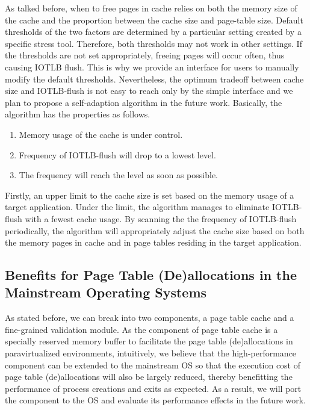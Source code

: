 As talked before, when to free pages in cache relies on both the memory size of the cache and the proportion between the cache size and page-table size. Default thresholds of the two factors are determined by a particular setting created by a specific stress tool. Therefore, both thresholds may not work in other settings. If the thresholds are not set appropriately, freeing pages will occur often, thus causing IOTLB flush. This is why we provide an interface for users to manually modify the default thresholds. Nevertheless, the optimum tradeoff between cache size and IOTLB-flush is not easy to reach only by the simple interface and we plan to propose a self-adaption algorithm in the future work. Basically, the algorithm has the properties as follows.
\begin{enumerate}
\item Memory usage of the cache is under control.
\item Frequency of IOTLB-flush will drop to a lowest level.
\item The frequency will reach the level as soon as possible.
\end{enumerate}

Firstly, an upper limit to the cache size is set based on the memory usage of a target application. Under the limit, the algorithm manages to eliminate IOTLB-flush with a fewest cache usage. By scanning the the frequency of IOTLB-flush periodically, the algorithm will appropriately adjust the cache size based on both the memory pages in cache and in page tables residing in the target application.



\subsection{Benefits for Page Table (De)allocations in the Mainstream Operating Systems}

As stated before, we can break \name into two components, a page table cache and a fine-grained validation module. As the component of page table cache is a specially reserved memory buffer to facilitate the page table (de)allocations in paravirtualized environments, intuitively, we believe that the high-performance component can be extended to the mainstream OS so that the execution cost of page table (de)allocations will also be largely reduced, thereby benefitting the performance of process creations and exits as expected. As a result, we will port the component to the OS and evaluate its performance effects in the future work.

